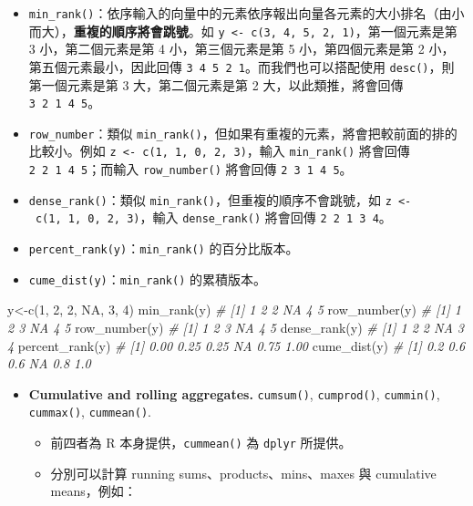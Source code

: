 \documentclass[
]{book}
\newenvironment{Shaded}{\begin{snugshade}}{\end{snugshade}}
\newcommand{\CommentTok}[1]{\textcolor[rgb]{0.56,0.35,0.01}{\textit{#1}}}
\newcommand{\ConstantTok}[1]{\textcolor[rgb]{0.00,0.00,0.00}{#1}}
\newcommand{\DecValTok}[1]{\textcolor[rgb]{0.00,0.00,0.81}{#1}}
\newcommand{\FunctionTok}[1]{\textcolor[rgb]{0.00,0.00,0.00}{#1}}
\newcommand{\NormalTok}[1]{#1}
\newcommand{\OtherTok}[1]{\textcolor[rgb]{0.56,0.35,0.01}{#1}}
\theoremstyle{definition}
\theoremstyle{remark}
\begin{document}
\begin{itemize}
  \begin{itemize}
  \item
    \texttt{min\_rank()}：依序輸入的向量中的元素依序報出向量各元素的大小排名（由小而大），\textbf{重複的順序將會跳號}。如 \texttt{y\ \textless{}-\ c(3,\ 4,\ 5,\ 2,\ 1)}，第一個元素是第 3 小，第二個元素是第 4 小，第三個元素是第 5 小，第四個元素是第 2 小，第五個元素最小，因此回傳 \texttt{3\ 4\ 5\ 2\ 1}。而我們也可以搭配使用 \texttt{desc()}，則第一個元素是第 3 大，第二個元素是第 2 大，以此類推，將會回傳 \texttt{3\ 2\ 1\ 4\ 5}。
  \item
    \texttt{row\_number}：類似 \texttt{min\_rank()}，但如果有重複的元素，將會把較前面的排的比較小。例如 \texttt{z\ \textless{}-\ c(1,\ 1,\ 0,\ 2,\ 3)}，輸入 \texttt{min\_rank()} 將會回傳 \texttt{2\ 2\ 1\ 4\ 5}；而輸入 \texttt{row\_number()} 將會回傳 \texttt{2\ 3\ 1\ 4\ 5}。
  \item
    \texttt{dense\_rank()}：類似 \texttt{min\_rank()}，但重複的順序不會跳號，如 \texttt{z\ \textless{}-\ c(1,\ 1,\ 0,\ 2,\ 3)}，輸入 \texttt{dense\_rank()} 將會回傳 \texttt{2\ 2\ 1\ 3\ 4}。
  \item
    \texttt{percent\_rank(y)}：\texttt{min\_rank()} 的百分比版本。
  \item
    \texttt{cume\_dist(y)}：\texttt{min\_rank()} 的累積版本。
  \end{itemize}
\end{itemize}

\begin{Shaded}
\begin{Highlighting}[]
\NormalTok{y}\OtherTok{\textless{}{-}}\FunctionTok{c}\NormalTok{(}\DecValTok{1}\NormalTok{, }\DecValTok{2}\NormalTok{, }\DecValTok{2}\NormalTok{, }\ConstantTok{NA}\NormalTok{, }\DecValTok{3}\NormalTok{, }\DecValTok{4}\NormalTok{)}
\FunctionTok{min\_rank}\NormalTok{(y)}
\CommentTok{\# [1]  1  2  2 NA  4  5}
\FunctionTok{row\_number}\NormalTok{(y)}
\CommentTok{\# [1]  1  2  3 NA  4  5}
\FunctionTok{row\_number}\NormalTok{(y)}
\CommentTok{\# [1]  1  2  3 NA  4  5}
\FunctionTok{dense\_rank}\NormalTok{(y)}
\CommentTok{\# [1]  1  2  2 NA  3  4}
\FunctionTok{percent\_rank}\NormalTok{(y)}
\CommentTok{\# [1] 0.00 0.25 0.25   NA 0.75 1.00}
\FunctionTok{cume\_dist}\NormalTok{(y)}
\CommentTok{\# [1] 0.2 0.6 0.6  NA 0.8 1.0}
\end{Highlighting}
\end{Shaded}

\begin{itemize}
\item
  \textbf{Cumulative and rolling aggregates.} \texttt{cumsum()}, \texttt{cumprod()}, \texttt{cummin()}, \texttt{cummax()}, \texttt{cummean()}.

  \begin{itemize}
  \item
    前四者為 R 本身提供，\texttt{cummean()} 為 \texttt{dplyr} 所提供。
  \item
    分別可以計算 running sums、products、mins、maxes 與 cumulative means，例如：
  \end{itemize}
\end{itemize}
\end{document}
